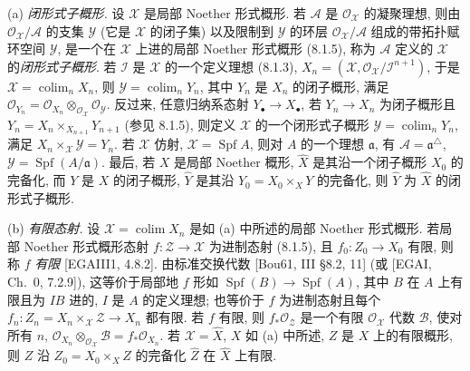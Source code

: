 (a) \emph{闭形式子概形.} 设 $\mathcal X$ 是局部 Noether 形式概形. 若 $\mathcal A$ 是 $\mathcal O_{\mathcal X}$ 的凝聚理想, 则由 $\mathcal O_{\mathcal X}/\mathcal A$ 的支集 $\mathcal Y$ (它是 $\mathcal X$ 的闭子集) 以及限制到 $\mathcal Y$ 的环层 $\mathcal O_{\mathcal X}/\mathcal A$ 组成的带拓扑赋环空间 $\mathcal Y$, 是一个在 $\mathcal X$ 上进的局部 Noether 形式概形 (8.1.5), 称为 $\mathcal A$ 定义的 $\mathcal X$ 的\emph{闭形式子概形}. 若 $\mathcal I$ 是 $\mathcal X$ 的一个定义理想 (8.1.3), $X_n=(\mathcal X,\mathcal O_{\mathcal X}/\mathcal I^{n+1})$, 于是 $\mathcal X=\operatorname{colim}_nX_n$, 则 $\mathcal Y=\operatorname{colim}_nY_n$, 其中 $Y_n$ 是 $X_n$ 的闭子概形, 满足 $\mathcal O_{Y_n}=\mathcal O_{X_n}\otimes_{\mathcal O_{\mathcal X}}\mathcal O_{\mathcal Y}$. 反过来, 任意归纳系态射 $Y_\bullet\to X_\bullet$, 若 $Y_n\to X_n$ 为闭子概形且 $Y_n=X_n\times_{X_{n+1}}Y_{n+1}$ (参见 8.1.5), 则定义 $\mathcal X$ 的一个闭形式子概形 $\mathcal Y=\operatorname{colim}_nY_n$, 满足 $X_n\times_{\mathcal X}\mathcal Y=Y_n$. 若 $\mathcal X$ 仿射, $\mathcal X=\operatorname{Spf}A$, 则对 $A$ 的一个理想 $\mathfrak a$, 有 $\mathcal A=\mathfrak a^\triangle$, $\mathcal Y=\operatorname{Spf}(A/\mathfrak a)$. 最后, 若 $X$ 是局部 Noether 概形, $\widehat X$ 是其沿一个闭子概形 $X_0$ 的完备化, 而 $Y$ 是 $X$ 的闭子概形, $\widehat Y$ 是其沿 $Y_0=X_0\times_XY$ 的完备化, 则 $\widehat Y$ 为 $\widehat X$ 的闭形式子概形.

(b) \emph{有限态射.} 设 $\mathcal X=\operatorname{colim}X_n$ 是如 (a) 中所述的局部 Noether 形式概形. 若局部 Noether 形式概形态射 $f:\mathcal Z\to\mathcal X$ 为进制态射 (8.1.5), 且 $f_0:Z_0\to X_0$ 有限, 则称 $f$ \emph{有限} [EGAIII1, 4.8.2]. 由标准交换代数 [Bou61, III §8.2, 11] (或 [EGAI, Ch.~0, 7.2.9]), 这等价于局部地 $f$ 形如 $\operatorname{Spf}(B)\to\operatorname{Spf}(A)$, 其中 $B$ 在 $A$ 上有限且为 $IB$ 进的, $I$ 是 $A$ 的定义理想; 也等价于 $f$ 为进制态射且每个 $f_n:Z_n=X_n\times_{\mathcal X}\mathcal Z\to X_n$ 都有限. 若 $f$ 有限, 则 $f_*\mathcal O_{\mathcal Z}$ 是一个有限 $\mathcal O_{\mathcal X}$ 代数 $\mathcal B$, 使对所有 $n$, $\mathcal O_{X_n}\otimes_{\mathcal O_{\mathcal X}}\mathcal B=f_*\mathcal O_{X_n}$. 若 $\mathcal X=\widehat X$, $X$ 如 (a) 中所述, $Z$ 是 $X$ 上的有限概形, 则 $Z$ 沿 $Z_0=X_0\times_XZ$ 的完备化 $\widehat Z$ 在 $\widehat X$ 上有限.

